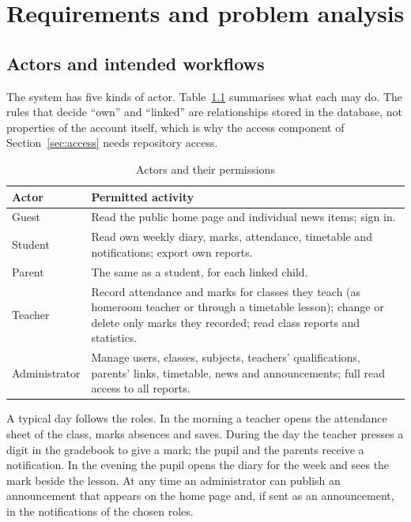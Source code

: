 \chapter{Requirements and problem analysis}

\section{Actors and intended workflows}

The system has five kinds of actor. Table~\ref{tab:actors} summarises what each may do. The rules that decide ``own'' and ``linked'' are relationships stored in the database, not properties of the account itself, which is why the access component of Section~\ref{sec:access} needs repository access.

\begin{table}[H]
\centering
\caption{Actors and their permissions}
\label{tab:actors}
\small
\begin{tabularx}{\textwidth}{@{}lX@{}}
\toprule
Actor & Permitted activity \\
\midrule
Guest & Read the public home page and individual news items; sign in. \\
Student & Read own weekly diary, marks, attendance, timetable and notifications; export own reports. \\
Parent & The same as a student, for each linked child. \\
Teacher & Record attendance and marks for classes they teach (as homeroom teacher or through a timetable lesson); change or delete only marks they recorded; read class reports and statistics. \\
Administrator & Manage users, classes, subjects, teachers' qualifications, parents' links, timetable, news and announcements; full read access to all reports. \\
\bottomrule
\end{tabularx}
\end{table}

A typical day follows the roles. In the morning a teacher opens the attendance sheet of the class, marks absences and saves. During the day the teacher presses a digit in the gradebook to give a mark; the pupil and the parents receive a notification. In the evening the pupil opens the diary for the week and sees the mark beside the lesson. At any time an administrator can publish an announcement that appears on the home page and, if sent as an announcement, in the notifications of the chosen roles.

